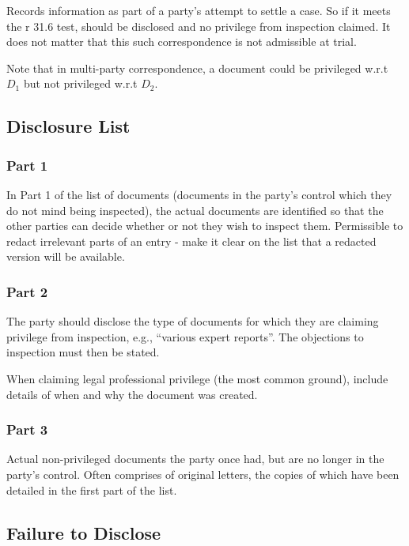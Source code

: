 \documentclass[
]{article}
\begin{document}
Records information as part of a party's attempt to settle a case. So if
it meets the r 31.6 test, should be disclosed and no privilege from
inspection claimed. It does not matter that this such correspondence is
not admissible at trial.

Note that in multi-party correspondence, a document could be privileged
w.r.t \(D_1\) but not privileged w.r.t \(D_2\).

\hypertarget{disclosure-list}{%
\subsection{Disclosure List}\label{disclosure-list}}

\hypertarget{part-1}{%
\subsubsection{Part 1}\label{part-1}}

In Part 1 of the list of documents (documents in the party's control
which they do not mind being inspected), the actual documents are
identified so that the other parties can decide whether or not they wish
to inspect them. Permissible to redact irrelevant parts of an entry -
make it clear on the list that a redacted version will be available.

\hypertarget{part-2}{%
\subsubsection{Part 2}\label{part-2}}

The party should disclose the type of documents for which they are
claiming privilege from inspection, e.g., ``various expert reports''.
The objections to inspection must then be stated.

When claiming legal professional privilege (the most common ground),
include details of when and why the document was created.

\hypertarget{part-3}{%
\subsubsection{Part 3}\label{part-3}}

Actual non-privileged documents the party once had, but are no longer in
the party's control. Often comprises of original letters, the copies of
which have been detailed in the first part of the list.

\hypertarget{failure-to-disclose}{%
\subsection{Failure to Disclose}\label{failure-to-disclose}}
\end{document}
